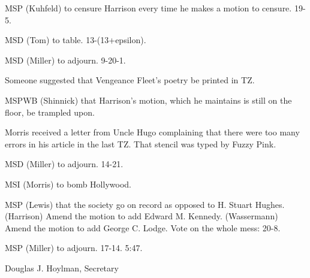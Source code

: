 \documentclass[12pt]{article}
\begin{document}
MSP (Kuhfeld) to censure Harrison every time he makes a motion to censure. 19-5.

MSD (Tom) to table. 13-(13+epsilon).

MSD (Miller) to adjourn. 9-20-1.

Someone suggested that Vengeance Fleet's poetry be printed in TZ.

MSPWB (Shinnick) that Harrison's motion, which he maintains is still on the floor, be trampled upon.

Morris received a letter from Uncle Hugo complaining that there were too many errors in his article in the last TZ. That stencil was typed by Fuzzy Pink.

MSD (Miller) to adjourn. 14-21.

MSI (Morris) to bomb Hollywood.

MSP (Lewis) that the society go on record as opposed to H. Stuart Hughes. (Harrison) Amend the motion to add Edward M. Kennedy. (Wassermann) Amend the motion to add George C. Lodge. Vote on the whole mess: 20-8.

MSP (Miller) to adjourn. 17-14. 5:47.

\vspace{12pt}

\centerline{Douglas J. Hoylman, Secretary}
\end{document}
